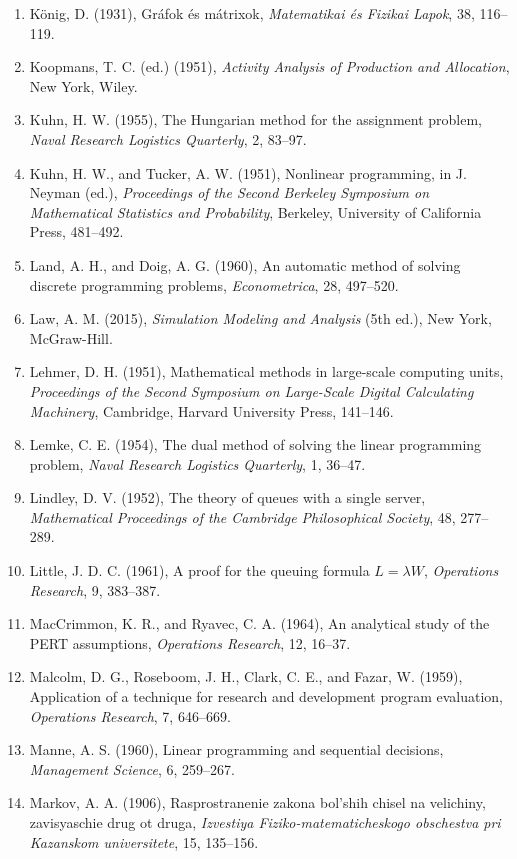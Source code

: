 \documentclass[11pt,a4paper]{article}
\numberwithin{equation}{section}
\theoremstyle{definition}
\begin{document}
\begin{enumerate}
\item K\"onig, D. (1931), Gr\'afok \'es m\'atrixok, \emph{Matematikai \'es Fizikai Lapok}, 38, 116--119.
\item Koopmans, T. C. (ed.) (1951), \emph{Activity Analysis of Production and Allocation}, New York, Wiley.
\item Kuhn, H. W. (1955), The Hungarian method for the assignment problem, \emph{Naval Research Logistics Quarterly}, 2, 83--97.
\item Kuhn, H. W., and Tucker, A. W. (1951), Nonlinear programming, in J. Neyman (ed.), \emph{Proceedings of the Second Berkeley Symposium on Mathematical Statistics and Probability}, Berkeley, University of California Press, 481--492.
\item Land, A. H., and Doig, A. G. (1960), An automatic method of solving discrete programming problems, \emph{Econometrica}, 28, 497--520.
\item Law, A. M. (2015), \emph{Simulation Modeling and Analysis} (5th ed.), New York, McGraw-Hill.
\item Lehmer, D. H. (1951), Mathematical methods in large-scale computing units, \emph{Proceedings of the Second Symposium on Large-Scale Digital Calculating Machinery}, Cambridge, Harvard University Press, 141--146.
\item Lemke, C. E. (1954), The dual method of solving the linear programming problem, \emph{Naval Research Logistics Quarterly}, 1, 36--47.
\item Lindley, D. V. (1952), The theory of queues with a single server, \emph{Mathematical Proceedings of the Cambridge Philosophical Society}, 48, 277--289.
\item Little, J. D. C. (1961), A proof for the queuing formula $L = \lambda W$, \emph{Operations Research}, 9, 383--387.
\item MacCrimmon, K. R., and Ryavec, C. A. (1964), An analytical study of the PERT assumptions, \emph{Operations Research}, 12, 16--37.
\item Malcolm, D. G., Roseboom, J. H., Clark, C. E., and Fazar, W. (1959), Application of a technique for research and development program evaluation, \emph{Operations Research}, 7, 646--669.
\item Manne, A. S. (1960), Linear programming and sequential decisions, \emph{Management Science}, 6, 259--267.
\item Markov, A. A. (1906), Rasprostranenie zakona bol'shih chisel na velichiny, zavisyaschie drug ot druga, \emph{Izvestiya Fiziko-matematicheskogo obschestva pri Kazanskom universitete}, 15, 135--156.

\end{enumerate}
\end{document}
